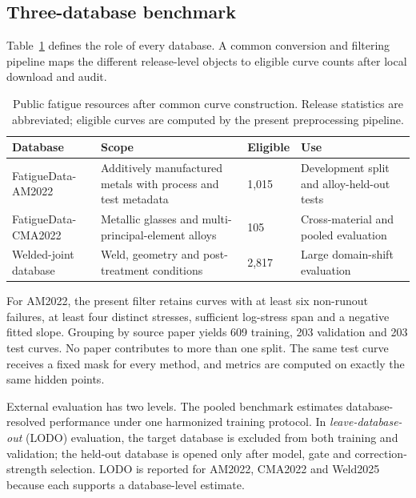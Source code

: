 \documentclass[a4paper,fleqn]{cas-dc}
\begin{document}
\subsection{Three-database benchmark}

Table~\ref{tab:datasets} defines the role of every database. A common conversion and filtering pipeline maps the different release-level objects to eligible curve counts after local download and audit.

\begin{table}[b]
\caption{Public fatigue resources after common curve construction. Release statistics are abbreviated; eligible curves are computed by the present preprocessing pipeline.}
\label{tab:datasets}
\centering
\scriptsize
\setlength{\tabcolsep}{5pt}
\renewcommand{\arraystretch}{1.05}
\begin{tabularx}{\textwidth}{p{3.0cm}X p{1.6cm} p{5.0cm}}
\toprule
Database & Scope & Eligible & Use \\
\midrule
FatigueData-AM2022 \cite{Zhang2023FatigueData} & Additively manufactured metals with process and test metadata & 1,015 & Development split and alloy-held-out tests \\
FatigueData-CMA2022 \cite{Zhang2023CMA} & Metallic glasses and multi-principal-element alloys & 105 & Cross-material and pooled evaluation \\
Welded-joint database \cite{Deng2025Welded} & Weld, geometry and post-treatment conditions & 2,817 & Large domain-shift evaluation \\
\bottomrule
\end{tabularx}
\end{table}

For AM2022, the present filter retains curves with at least six non-runout failures, at least four distinct stresses, sufficient log-stress span and a negative fitted slope. Grouping by source paper yields 609 training, 203 validation and 203 test curves. No paper contributes to more than one split. The same test curve receives a fixed mask for every method, and metrics are computed on exactly the same hidden points.

External evaluation has two levels. The pooled benchmark estimates database-resolved performance under one harmonized training protocol. In \emph{leave-database-out} (LODO) evaluation, the target database is excluded from both training and validation; the held-out database is opened only after model, gate and correction-strength selection. LODO is reported for AM2022, CMA2022 and Weld2025 because each supports a database-level estimate.
\end{document}
